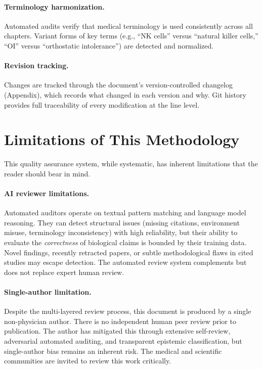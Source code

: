 \paragraph{Terminology harmonization.}
Automated audits verify that medical terminology is used consistently across all chapters. Variant forms of key terms (e.g., ``NK cells'' versus ``natural killer cells,'' ``OI'' versus ``orthostatic intolerance'') are detected and normalized.

\paragraph{Revision tracking.}
Changes are tracked through the document's version-controlled changelog (Appendix), which records what changed in each version and why. Git history provides full traceability of every modification at the line level.

\section*{Limitations of This Methodology}
\label{sec:meth-limitations}

This quality assurance system, while systematic, has inherent limitations that the reader should bear in mind.

\paragraph{AI reviewer limitations.}
Automated auditors operate on textual pattern matching and language model reasoning. They can detect structural issues (missing citations, environment misuse, terminology inconsistency) with high reliability, but their ability to evaluate the \emph{correctness} of biological claims is bounded by their training data. Novel findings, recently retracted papers, or subtle methodological flaws in cited studies may escape detection. The automated review system complements but does not replace expert human review.

\paragraph{Single-author limitation.}
Despite the multi-layered review process, this document is produced by a single non-physician author. There is no independent human peer review prior to publication. The author has mitigated this through extensive self-review, adversarial automated auditing, and transparent epistemic classification, but single-author bias remains an inherent risk. The medical and scientific communities are invited to review this work critically.

